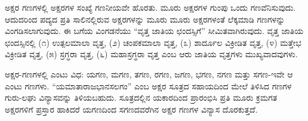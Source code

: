 
\indent ಅಕ್ಷರ ಗಣಗಳಲ್ಲಿ ಅಕ್ಷರಗಳ ಸಂಖ್ಯೆ ಗಣನೀಯವೇ ಹೊರತು. ಮೂರು ಅಕ್ಷರಗಳ ಗುಂಪು ಒಂದು ಗಣವೆನಿಸುವುದು. ಆದುದರಿಂದ ಪದ್ಯದ ಪ್ರತಿ ಸಾಲಿನಲ್ಲಿರುವ ಅಕ್ಷರಗಳನ್ನು ಮೂರು ಮೂರು ಅಕ್ಷರಗಳಂತೆ ಲೆಕ್ಕಮಾಡಿ ಗಣಗಳನ್ನು ವಿಂಗಡಿಸಲಾಗುವುದು. ಈ ಬಗೆಯ ವಿಂಗಡನೆಯು “ವೃತ್ತ ಜಾತಿಯ ಛಂದಸ್ಸಿಗೆ” ಸೀಮಿತವಾಗಿರುವುದು. ವೃತ್ತ ಜಾತಿಯ ಛಂದಸ್ಸಿನಲ್ಲಿ (೧) ಉತ್ಪಲಮಾಲಾ ವೃತ್ತ, (೨) ಚಂಪಕಮಾಲಾ ವೃತ್ತ, (೩) ಶಾರ್ದೂಲ ವಿಕ್ರೀಡಿತ ವೃತ್ತ, (೪) ಮತ್ತೇಭ ವಿಕ್ರೀಡಿತ ವೃತ್ತ, (೫) ಸ್ರಗ್ಧರಾ ವೃತ್ತ, (೬) ಮಹಾಸ್ರಗ್ಧರಾ ವೃತ್ತ ಎಂಬ ಆರು ಜಾತಿಯ ವೃತ್ತಗಳು ಮುಖ್ಯವಾದವುಗಳು.\par

\indent ಅಕ್ಷರ-ಗಣಗಳಲ್ಲಿ ಎಂಟು ವಿಧ: ಯಗಣ, ಮಗಣ, ತಗಣ, ರಗಣ, ಜಗಣ, ಭಗಣ, ನಗಣ ಮತ್ತು ಸಗಣ-ಇವೇ ಆ ಎಂಟು ಗಣಗಳು. “ಯಮಾತಾರಾಜಭಾನಸಲಗಂ” ಎಂಬ ಅಕ್ಷರ ಸೂತ್ರದ ಸಹಾಯದಿಂದ ಮೇಲೆ ತಿಳಿಸಿದ ಗಣಗಳ ಗುರು-ಲಘು ವಿನ್ಯಾಸವನ್ನು ತಿಳಿಯಬಹುದು. ಸೂತ್ರದಲ್ಲಿನ ಯಕಾರದಿಂದ ಪ್ರಾರಂಭಿಸಿ ಪ್ರತಿ ಮೂರು ಕ್ರಮಗತ ಅಕ್ಷರಗಳಿಗೆ ಪ್ರಸ್ತಾರ ಹಾಕಿದರೆ ಯಗಣದಿಂದ ಸಗಣದವರೆಗಿನ ಅಕ್ಷರ ಗಣಗಳ ವಿನ್ಯಾಸ ದೊರಕುತ್ತದೆ.\par


\vspace{3pt plus 2pt}\noindent\hspace*{1.2em}\par\vspace{1pt}

\vspace{5pt plus 4pt minus 1pt}
\vspace{5pt plus 4pt minus 1pt}
